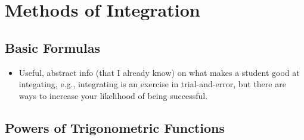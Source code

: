\documentclass[../main.tex]{subfiles}
\begin{document}
\chapter{Methods of Integration}
\section{Basic Formulas}
\begin{itemize}
    \item {}Useful, abstract info (that I already know) on what makes a student good at integating, e.g., integrating is an exercise in trial-and-error, but there are ways to increase your likelihood of being successful.
\end{itemize}



\section{Powers of Trigonometric Functions}
\end{document}
